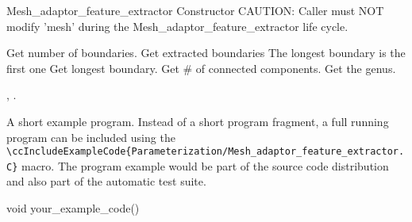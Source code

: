 \begin{ccRefClass}{Mesh_adaptor_feature_extractor}
{
Constructor
CAUTION: Caller must NOT modify 'mesh' during the Mesh\_adaptor\_feature\_extractor life cycle.
}
{
}


\ccOperations

{
Get number of boundaries.
}
{
Get extracted boundaries The longest boundary is the first one
}
{
Get longest boundary.
}
{
Get \# of connected components.
}
{
Get the genus.
}


\ccSeeAlso

,
.

\ccExample

A short example program.
Instead of a short program fragment, a full running program can be
included using the 
\verb|\ccIncludeExampleCode{Parameterization/Mesh_adaptor_feature_extractor.C}| 
macro. The program example would be part of the source code distribution and
also part of the automatic test suite.

\begin{ccExampleCode}
void your_example_code() {
}
\end{ccExampleCode}


\end{ccRefClass}


